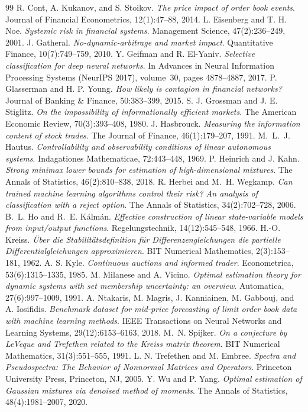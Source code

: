 \documentclass[11pt,a4paper]{article}
\theoremstyle{definition}\newtheorem{definition}[theorem]{Definition}
\theoremstyle{remark}\newtheorem{remark}[theorem]{Remark}
\begin{document}
\begin{thebibliography}{99}
 R. Cont, A. Kukanov, and S. Stoikov. \emph{The price impact of order book events}. Journal of Financial Econometrics, 12(1):47--88, 2014.
 L. Eisenberg and T. H. Noe. \emph{Systemic risk in financial systems}. Management Science, 47(2):236--249, 2001.
 J. Gatheral. \emph{No-dynamic-arbitrage and market impact}. Quantitative Finance, 10(7):749--759, 2010.
 Y. Geifman and R. El-Yaniv. \emph{Selective classification for deep neural networks}. In Advances in Neural Information Processing Systems (NeurIPS 2017), volume~30, pages 4878--4887, 2017.
 P. Glasserman and H. P. Young. \emph{How likely is contagion in financial networks?} Journal of Banking \& Finance, 50:383--399, 2015.
 S. J. Grossman and J. E. Stiglitz. \emph{On the impossibility of informationally efficient markets}. The American Economic Review, 70(3):393--408, 1980.
 J. Hasbrouck. \emph{Measuring the information content of stock trades}. The Journal of Finance, 46(1):179--207, 1991.
 M.~L.~J. Hautus. \emph{Controllability and observability conditions of linear autonomous systems}. Indagationes Mathematicae, 72:443--448, 1969.
 P. Heinrich and J. Kahn. \emph{Strong minimax lower bounds for estimation of high-dimensional mixtures}. The Annals of Statistics, 46(2):810--838, 2018.
 R. Herbei and M.~H. Wegkamp. \emph{Can trained machine learning algorithms control their risk? An analysis of classification with a reject option}. The Annals of Statistics, 34(2):702--728, 2006.
 B.~L. Ho and R.~E. K{\'a}lm{\'a}n. \emph{Effective construction of linear state-variable models from input/output functions}. Regelungstechnik, 14(12):545--548, 1966.
 H.-O. Kreiss. \emph{{\"U}ber die Stabilit{\"a}tsdefinition f{\"u}r Differenzengleichungen die partielle Differentialgleichungen approximieren}. BIT Numerical Mathematics, 2(3):153--181, 1962.
 A. S. Kyle. \emph{Continuous auctions and informed trader}. Econometrica, 53(6):1315--1335, 1985.
 M. Milanese and A. Vicino. \emph{Optimal estimation theory for dynamic systems with set membership uncertainty: an overview}. Automatica, 27(6):997--1009, 1991.
 A. Ntakaris, M. Magris, J. Kanniainen, M. Gabbouj, and A. Iosifidis. \emph{Benchmark dataset for mid-price forecasting of limit order book data with machine learning methods}. IEEE Transactions on Neural Networks and Learning Systems, 29(12):6153--6163, 2018.
 M.~N. Spijker. \emph{On a conjecture by LeVeque and Trefethen related to the Kreiss matrix theorem}. BIT Numerical Mathematics, 31(3):551--555, 1991.
 L. N. Trefethen and M. Embree. \emph{Spectra and Pseudospectra: The Behavior of Nonnormal Matrices and Operators}. Princeton University Press, Princeton, NJ, 2005.
 Y. Wu and P. Yang. \emph{Optimal estimation of Gaussian mixtures via denoised method of moments}. The Annals of Statistics, 48(4):1981--2007, 2020.
\end{thebibliography}
\end{document}
